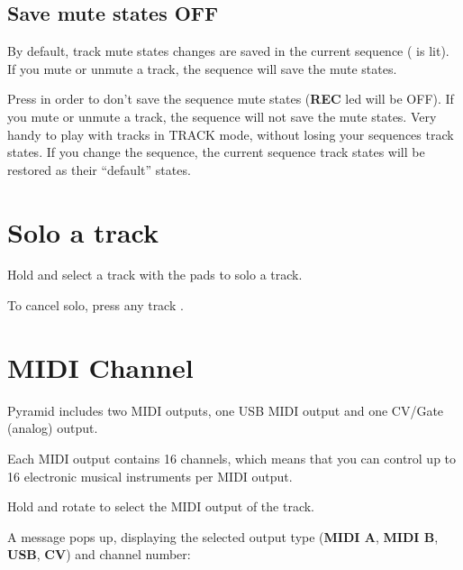 \subsection{Save mute states OFF}

By default, track mute states changes are saved in the current sequence ( is lit). If you mute or unmute a track, the sequence will save the mute states.


Press  in order to don't save the sequence mute states (\textbf{REC} led will be OFF). If you mute or unmute a track, the sequence will not save the mute states. Very handy to play with tracks in TRACK mode, without losing your sequences track states. If you change the sequence, the current sequence track states will be restored as their ``default'' states.


\section{Solo a track}

Hold  and select a track with the pads \padsicon{} to solo a track.

To cancel solo, press any track \padsicon{}.


\section{MIDI Channel}

Pyramid includes two MIDI outputs, one USB MIDI output and one CV/Gate (analog) output.

Each MIDI output contains 16 channels, which means that you can control up to 16 electronic musical instruments per MIDI output.

Hold  and rotate \encodericon{} to select the MIDI output of the track.


A message pops up, displaying the selected output type (\textbf{MIDI A}, \textbf{MIDI B}, \textbf{USB}, \textbf{CV}) and channel number:



